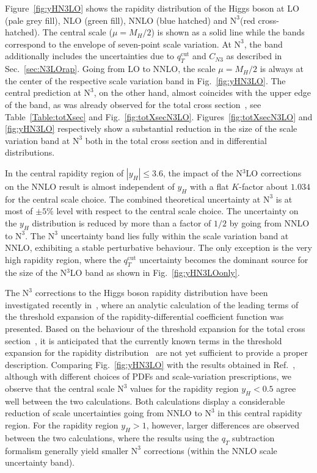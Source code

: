 \documentclass[12pt]{article}
\DeclareRobustCommand{\qt}{\ensuremath{q_T}\xspace}
\DeclareRobustCommand{\qtcut}{\ensuremath{q_T^\mathrm{cut}}\xspace}
\DeclareRobustCommand{\LO}{\text{LO}\xspace}
\DeclareRobustCommand{\N}[1]{\ensuremath{\text{N}^{#1}}} %
\begin{document}
Figure~\ref{fig:yHN3LO} shows the rapidity distribution of the Higgs boson at LO (pale grey fill), NLO (green fill), NNLO (blue hatched) and \N3\LO (red cross-hatched). 
The central scale ($\mu=M_{H}/2$) is shown as a solid line while the bands correspond to the envelope of seven-point scale variation. 
At \N3\LO, the band additionally includes the uncertainties due to $\qtcut$ and $C_{N3}$ as described in Sec.~\ref{sec:N3LOrap}.
Going from LO to NNLO, the scale $\mu=M_{H}/2$ is always at the center of the respective scale variation band in Fig.~\ref{fig:yHN3LO}.  The central prediction at \N3\LO, on the other hand, almost coincides with the upper edge of the band, as was already observed for the total cross section~\cite{Anastasiou:2015ema,Mistlberger:2018etf}, see Table~\ref{Table:totXsec} and Fig.~\ref{fig:totXsecN3LO}.
Figures~\ref{fig:totXsecN3LO} and \ref{fig:yHN3LO} respectively show a substantial reduction in the size of the scale variation band at \N3\LO both in the total cross section and in differential distributions.

In the central rapidity region of $|y_{H}| \leq 3.6$, the impact of the N$^{3}$LO corrections on the NNLO result is almost independent of $y_{H}$ with a flat $K$-factor about $1.034$ for the central scale choice. The combined theoretical uncertainty at \N3\LO is at most of $\pm 5 \%$ level with respect to the central scale choice. The uncertainty on the $y_H$ distribution is reduced by more than a factor of $1/2$ by going from NNLO to \N3\LO. The \N3\LO uncertainty band lies fully within the scale variation band at NNLO, exhibiting a stable perturbative behaviour. 
The only exception is the very high rapidity region, where the $\qtcut$ uncertainty becomes the dominant source for the size of the N$^{3}$LO band as shown in Fig.~\ref{fig:yHN3LOonly}.

The \N3\LO corrections to the Higgs boson rapidity distribution have been investigated recently in~\cite{Dulat:2017prg},
where an analytic calculation of the leading terms of the threshold expansion of the  rapidity-differential coefficient function 
was presented. Based on the behaviour of the threshold expansion for the total cross section~\cite{Anastasiou:2015ema}, 
it is anticipated that the currently known terms in the threshold expansion for the rapidity distribution~\cite{Dulat:2017prg} are not yet sufficient to provide a proper description.  
Comparing Fig.~\ref{fig:yHN3LO} with the results obtained in Ref.~\cite{Dulat:2017prg}, although with different choices of PDFs and scale-variation prescriptions, we observe that the central scale \N3\LO values for the rapidity region $y_H < 0.5$ agree well between the two calculations. Both calculations display a considerable reduction of scale uncertainties going from NNLO to \N3\LO in this central rapidity region. 
For the rapidity region $y_H > 1$, however, larger differences are observed between the two calculations, where the results using the $\qt$ subtraction formalism generally yield smaller \N3\LO corrections 
(within the NNLO scale uncertainty band).
\end{document}
